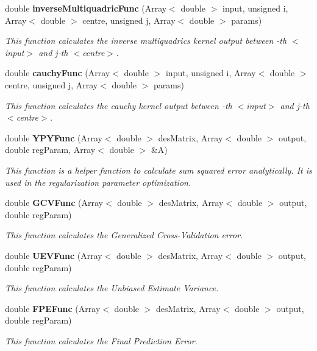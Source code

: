 \begin{CompactItemize}
double {\bf inverse\-Multiquadric\-Func} (Array$<$ double $>$ input, unsigned i, Array$<$ double $>$ centre, unsigned j, Array$<$ double $>$ params)
\begin{CompactList}\small\item\em This function calculates the inverse multiquadrics kernel output between {\em -th $<$input$>$ and j-th $<$centre$>$. \/}\item\end{CompactList}\item 
double {\bf cauchy\-Func} (Array$<$ double $>$ input, unsigned i, Array$<$ double $>$ centre, unsigned j, Array$<$ double $>$ params)
\begin{CompactList}\small\item\em This function calculates the cauchy kernel output between {\em -th $<$input$>$ and j-th $<$centre$>$. \/}\item\end{CompactList}\item 
double {\bf YPYFunc} (Array$<$ double $>$ des\-Matrix, Array$<$ double $>$ output, double reg\-Param, Array$<$ double $>$ \&A)
\begin{CompactList}\small\item\em This function is a helper function to calculate sum squared error analytically. It is used in the regularization parameter optimization. \item\end{CompactList}\item 
double {\bf GCVFunc} (Array$<$ double $>$ des\-Matrix, Array$<$ double $>$ output, double reg\-Param)
\begin{CompactList}\small\item\em This function calculates the Generalized Cross-Validation error. \item\end{CompactList}\item 
double {\bf UEVFunc} (Array$<$ double $>$ des\-Matrix, Array$<$ double $>$ output, double reg\-Param)
\begin{CompactList}\small\item\em This function calculates the Unbiased Estimate Variance. \item\end{CompactList}\item 
double {\bf FPEFunc} (Array$<$ double $>$ des\-Matrix, Array$<$ double $>$ output, double reg\-Param)
\begin{CompactList}\small\item\em This function calculates the Final Prediction Error. \item\end{CompactList}\item 

\end{CompactItemize}
